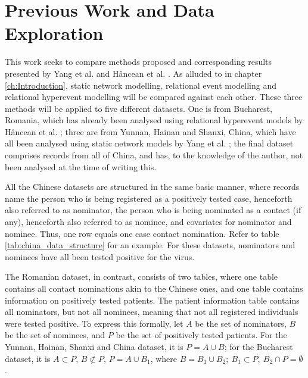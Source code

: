 \chapter{Previous Work and Data Exploration}
\label{ch:previous_work_data}

This work seeks to compare methods proposed and corresponding results presented by Yang et al. \cite{shaanxi_publication,hainan_publication} and Hâncean et al. \cite{hancean2022occupations}. As alluded to in chapter \ref{ch:Introduction}, static network modelling, relational event modelling and relational hyperevent modelling will be compared against each other. These three methods will be applied to five different datasets. One is from Bucharest, Romania, which has already been analysed using relational hyperevent models by Hâncean et al. \cite{hancean2022occupations}; three are from Yunnan, Hainan and Shanxi, China, which have all been analysed using static network models by Yang et al. \cite{hainan_publication,shaanxi_publication}; the final dataset comprises records from all of China, and has, to the knowledge of the author, not been analysed at the time of writing this.

All the Chinese datasets are structured in the same basic manner, where records name the person who is being registered as a positively tested case, henceforth also referred to as nominator, the person who is being nominated as a contact (if any), henceforth also referred to as nominee, and covariates for nominator and nominee. Thus, one row equals one case contact nomination. Refer to table \ref{tab:china_data_structure} for an example. For these datasets, nominators and nominees have all been tested positive for the virus.

The Romanian dataset, in contrast, consists of two tables, where one table contains all contact nominations akin to the Chinese ones, and one table contains information on positively tested patients. The patient information table contains all nominators, but not all nominees, meaning that not all registered individuals were tested positive. 
To express this formally, let $A$ be the set of nominators, $B$ be the set of nominees, and $P$ be the set of positively tested patients. For the Yunnan, Hainan, Shanxi and China dataset, it is $P = A \cup B$; for the Bucharest dataset, it is $A \subset P$, $B \not\subset P$, $P = A \cup B_1$, where $B = B_1 \cup B_2;\: B_1 \subset P,\: B_2 \cap P = \emptyset$.

